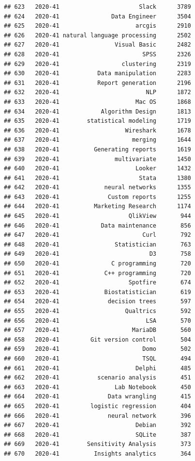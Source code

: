 \documentclass[
]{article}
\begin{document}
\begin{verbatim}
## 623   2020-41                       Slack      3789
## 624   2020-41               Data Engineer      3504
## 625   2020-41                      arcgis      2910
## 626   2020-41 natural language processing      2502
## 627   2020-41                Visual Basic      2482
## 628   2020-41                        SPSS      2326
## 629   2020-41                  clustering      2319
## 630   2020-41           Data manipulation      2283
## 631   2020-41           Report generation      2196
## 632   2020-41                         NLP      1872
## 633   2020-41                      Mac OS      1868
## 634   2020-41            Algorithm Design      1813
## 635   2020-41        statistical modeling      1719
## 636   2020-41                   Wireshark      1678
## 637   2020-41                     merging      1644
## 638   2020-41          Generating reports      1619
## 639   2020-41                multivariate      1450
## 640   2020-41                      Looker      1432
## 641   2020-41                       Stata      1380
## 642   2020-41             neural networks      1355
## 643   2020-41              Custom reports      1255
## 644   2020-41          Marketing Research      1174
## 645   2020-41                    QlikView       944
## 646   2020-41            Data maintenance       856
## 647   2020-41                        Curl       792
## 648   2020-41                Statistician       763
## 649   2020-41                          D3       758
## 650   2020-41               C programming       720
## 651   2020-41             C++ programming       720
## 652   2020-41                    Spotfire       674
## 653   2020-41             Biostatistician       619
## 654   2020-41              decision trees       597
## 655   2020-41                   Qualtrics       592
## 656   2020-41                         LSA       570
## 657   2020-41                     MariaDB       560
## 658   2020-41         Git version control       504
## 659   2020-41                        Domo       502
## 660   2020-41                        TSQL       494
## 661   2020-41                      Delphi       485
## 662   2020-41           scenario analysis       451
## 663   2020-41                Lab Notebook       450
## 664   2020-41              Data wrangling       415
## 665   2020-41         logistic regression       404
## 666   2020-41              neural network       396
## 667   2020-41                      Debian       392
## 668   2020-41                      SQLite       387
## 669   2020-41        Sensitivity Analysis       373
## 670   2020-41          Insights analytics       364

\end{verbatim}
\end{document}
